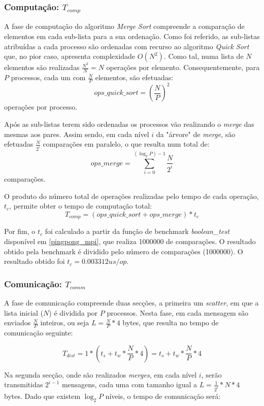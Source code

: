 \documentclass{article}
\begin{document}
\subsubsection{Computação: $T_{comp}$}
A fase de computação do algoritmo \textit{Merge Sort} compreende a comparação de elementos em cada sub-lista para a sua ordenação.
Como foi referido, as sub-listas atribuídas a cada processo são ordenadas com recurso ao algoritmo \textit{Quick Sort} que, no pior
caso, apresenta complexidade $O(N^2)$. Como tal, numa lista de $N$ elementos são realizadas $\frac{N^2}{N}=N$ operações por elemento. 
Consequentemente, para $P$ processos, cada um com $\frac{N}{P}$ elementos, são efetuadas:
$$ops\_quick\_sort = \left(\frac{N}{P}\right)^2$$ 
operações por processo.

Após as sub-listas terem sido ordenadas os processos vão realizando o \textit{merge} das mesmas aos pares. Assim sendo,
em cada nível $i$ da "árvore" de \textit{merge}, são efetuadas $\frac{N}{2^i}$ comparações em paralelo, o que resulta num total de:
$$ops\_merge = \sum_{i=0}^{(\log_{2}P)-1}{\frac{N}{2^i}}$$
comparações.

O produto do número total de operações realizadas pelo tempo de cada operação, $t_c$, permite obter o tempo de computação total:
$$ T_{comp} = (ops\_quick\_sort + ops\_merge) * t_c $$

Por fim, o $t_c$ foi calculado a partir da função de benchmark \textit{boolean\_test} disponível em \ref{pingpong_mpi}, que realiza 1000000 de comparações. O resultado obtido pela benchmark é dividido pelo número de comparações (1000000). O resultado obtido foi $t_c = 0.003312us/op$.

\subsubsection{Comunicação: $T_{comm}$}

A fase de comunicação compreende duas secções, a primeira um \textit{scatter}, em que a lista inicial ($N$) é dividida por $P$ processos. Nesta fase, em cada mensagem são enviados $\frac{N}{P}$ inteiros, ou seja $L=\frac{N}{P}*4$ bytes, que resulta no tempo de comunicação seguinte:

$$ T_{dist} = 1 * (t_s + t_w * \frac{N}{P} * 4) = t_s + t_w * \frac{N}{P} * 4 $$

Na segunda secção, onde são realizados \textit{merges}, em cada nível $i$, serão transmitidas $2^{i-1}$ mensagens, cada uma com tamanho igual a $L=\frac{1}{2^i}*N*4$ bytes. Dado que existem $\log_{2}P$ níveis, o tempo de comunicação será:
\end{document}
